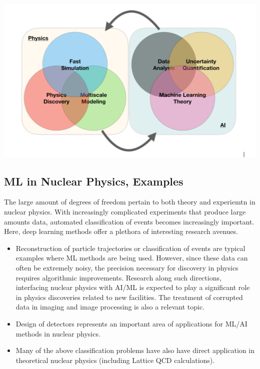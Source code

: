 \documentclass[%
oneside,                 %
final,                   %
10pt]{article}
\begin{document}
\vspace{6mm}

\centerline{\includegraphics[width=0.9\linewidth]{figures/mlimage.png}}

\vspace{6mm}




\subsection{ML in Nuclear Physics, Examples}

The large amount of degrees of freedom pertain to both theory and experiemtn in nuclear physics. With increasingly complicated experiments that produce large amounts data, automated classification of events becomes increasingly important. Here, deep learning methods offer a plethora of interesting research avenues. 

\begin{itemize}
\item Reconstruction of particle trajectories or classification of events are typical examples where ML methods are being used. However, since these data can often be extremely noisy, the precision necessary for discovery in physics requires algorithmic improvements. Research along such directions, interfacing nuclear physics with AI/ML is expected to play a significant role in physics discoveries related to new facilities.  The treatment of corrupted data in imaging and image processing is also a relevant topic. 

\item Design of detectors represents an important area of applications for ML/AI methods in nuclear physics.

\item Many of the above classification problems have also have direct application in theoretical nuclear physics (including Lattice QCD calculations).
\end{itemize}
\end{document}
